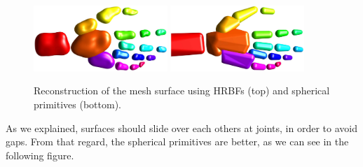 \documentclass[a4paper,10pt]{article}
\begin{document}
\begin{multicols}{2}
\begin{figure}[H]
\centering
\includegraphics[width=0.45\textwidth]{figs/hand_bone_hrbf}
\includegraphics[width=0.45\textwidth]{figs/hand_bone_sphere}
\caption{Reconstruction of the mesh surface using HRBFs (top) and spherical primitives (bottom).}
\end{figure}

As we explained, surfaces should slide over each others at joints, in order to avoid gaps.
From that regard, the spherical primitives are better, as we can see in the following figure.


\end{multicols}
\end{document}
